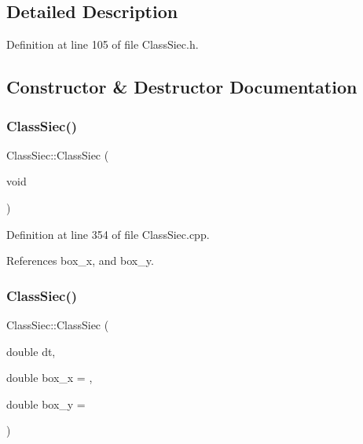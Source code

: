 \subsection{Detailed Description}


Definition at line 105 of file Class\+Siec.\+h.



\subsection{Constructor \& Destructor Documentation}
\mbox{\label{classClassSiec_ae87ded45ef76f08bf3116f3a933126a1}} 
\subsubsection{\texorpdfstring{Class\+Siec()}{ClassSiec()}\hspace{0.1cm}{\footnotesize\ttfamily [1/2]}}
{\footnotesize\ttfamily Class\+Siec\+::\+Class\+Siec (\begin{DoxyParamCaption}\item[{void}]{ }\end{DoxyParamCaption})}



Definition at line 354 of file Class\+Siec.\+cpp.



References box\+\_\+x, and box\+\_\+y.

\mbox{\label{classClassSiec_a3a1c1350b50c564e85ff7371bff71777}} 
\subsubsection{\texorpdfstring{Class\+Siec()}{ClassSiec()}\hspace{0.1cm}{\footnotesize\ttfamily [2/2]}}
{\footnotesize\ttfamily Class\+Siec\+::\+Class\+Siec (\begin{DoxyParamCaption}\item[{double}]{dt,  }\item[{double}]{box\+\_\+x = {},  }\item[{double}]{box\+\_\+y = {} }\end{DoxyParamCaption})}

